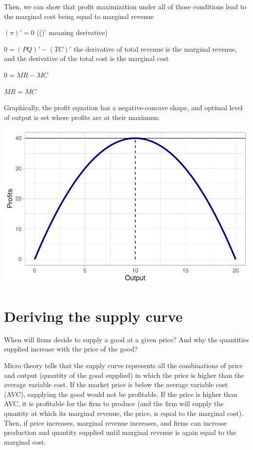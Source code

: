 \documentclass[
  letterpaper,
  DIV=11,
  numbers=noendperiod]{scrreprt}
\begin{document}
Then, we can show that profit maximization under all of those conditions
lead to the marginal cost being equal to marginal revenue

\((\pi)' = 0\) (()' meaning derivative)

\(0 =(PQ)' - (TC)'\) the derivative of total revenue is the marginal
revenue, and the derivative of the total cost is the marginal cost

\(0 =MR - MC\)

\(MR = MC\)

Graphically, the profit equation has a negative-concave shape, and
optimal level of output is set where profits are at their maximum:

\includegraphics{production-theory_files/figure-pdf/unnamed-chunk-13-1.pdf}

\hypertarget{deriving-the-supply-curve}{%
\section{Deriving the supply curve}\label{deriving-the-supply-curve}}

When will firms decide to supply a good at a given price? And why the
quantities supplied increase with the price of the good?

Micro theory tells that the supply curve represents all the combinations
of price and output (quantity of the good supplied) in which the price
is higher than the average variable cost. If the market price is below
the average variable cost (AVC), supplying the good would not be
profitable. If the price is higher than AVC, it is profitable for the
firm to produce (and the firm will supply the quantity at which its
marginal revenue, the price, is equal to the marginal cost). Then, if
price increases, marginal revenue increases, and firms can increase
production and quantity supplied until marginal revenue is again equal
to the marginal cost.
\end{document}
